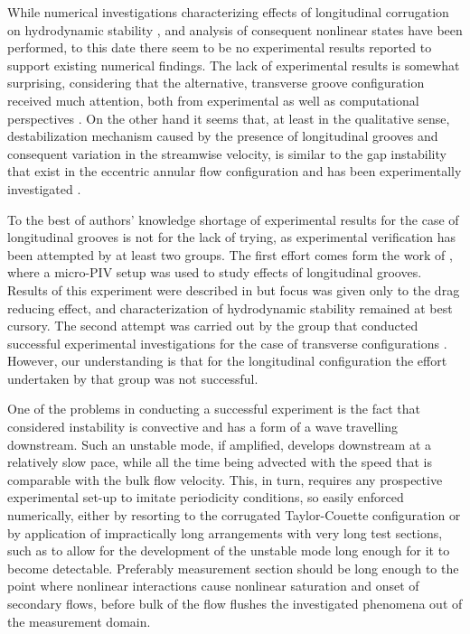 \documentclass[lineno]{jfm}
\begin{document}
While numerical investigations characterizing effects of longitudinal corrugation on hydrodynamic stability \citep{Szumbar2007, Szumbar2011, Mohammadi2015}, and analysis of consequent nonlinear states \citep{Nikesh2017,Pushenko2021} have been performed, to this date there seem to be no experimental results reported to support existing numerical findings.
The lack of experimental results is somewhat surprising, considering that the alternative, transverse groove configuration received much attention, both from experimental as well as computational perspectives \citep[][]{Sobey1980a,Nishimura1984,Nishimura1985,Nishimura1990b,Nishimura1990a,Gschwind1995,mitsudharmadi2012,Blancher1998,Floryan2010,Cabal2002, gepner2016, Rivera2013,gepner2016}.
On the other hand it seems that, at least in the qualitative sense, destabilization mechanism caused by the presence of longitudinal grooves and consequent variation in the streamwise velocity, is similar to the gap instability \citep{Gagnon_Tavoularis_2021, moradi2019flow} that exist in the eccentric annular flow configuration and has been experimentally investigated \citep{Piot2011}.

To the best of authors' knowledge shortage of experimental results for the case of longitudinal grooves is not for the lack of trying,
as experimental verification has been attempted by at least two groups.
The first effort comes form the work of \citet[][a PhD thesis in Polish]{Blonski2007},
where a micro-PIV setup was used to study effects of longitudinal grooves.
Results of this experiment were described in
\citep{szumbarski2011impact} but focus was given only to the drag reducing effect,
and characterization of hydrodynamic stability remained at best cursory.
The second attempt was carried out by the group that conducted successful experimental investigations for the case of transverse configurations \citep{Asai2006,Floryan2011}.
However, our understanding is that for the longitudinal configuration the effort undertaken by that group was not successful.%

One of the problems in conducting a successful experiment is the fact that considered instability is convective and has a form of a wave travelling downstream.
Such an unstable mode, if amplified, develops downstream at a relatively slow pace,
while all the time being advected with the speed that is comparable with the bulk flow velocity.
This, in turn, requires any prospective experimental set-up to imitate periodicity conditions, so easily enforced numerically,
either by resorting to the corrugated Taylor-Couette configuration \citep[see][for numerical analysis of such configuration]{Ng2018}
or by application of impractically long arrangements with very long test sections,
such as to allow for the development of the unstable mode long enough for it to become detectable.
Preferably measurement section should be long enough to the point where nonlinear interactions cause nonlinear saturation and onset of secondary flows, before bulk of the flow flushes the investigated phenomena out of the measurement domain.
\end{document}
